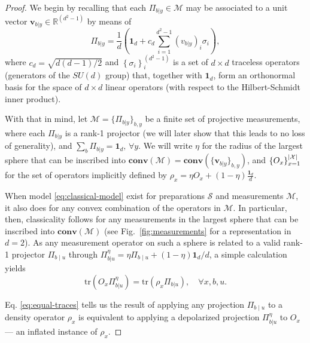 \documentclass[a4paper,preprintnumbers,floatfix,superscriptaddress,pra,twocolumn,showpacs,notitlepage,longbibliography]{revtex4-2}
\begin{document}
    \begin{proof}
        We begin by recalling that each $\Pi_{b \vert y} \in \mathcal{M}$ may be associated to a unit vector $\bm{v}_{b|y} \in \mathds{R}^{(d^{2}-1)}$ by means of
        \begin{equation}
            \Pi_{b|y} = \frac{1}{d}\left(\bm{1}_{d} + c_{d}\sum_{i=1}^{d^{2}-1}(v_{b|y})_{i} \sigma_{i}\right),
        \end{equation}
        where $c_{d} = \sqrt{d(d-1)/2}$ and $\left\{ \sigma_{i} \right\}_{i}^{(d^{2}-1)}$ is a set of $d \times d$ traceless operators (generators of the $SU(d)$ group) that, together with $\bm{1}_{d}$, form an orthonormal basis for the space of $d\times d$ linear operators (with respect to the Hilbert-Schmidt inner product).
        
        With that in mind, let $\mathcal{M} = \{ \Pi_{b \vert y} \}_{b, y}$ be a finite set of projective measurements, where each $\Pi_{b \vert y}$ is a rank-1 projector (we will later show that this leads to no loss of generality), and $\sum_b \Pi_{b \vert y} = \bm{1}_d, \,\forall y$. We will write $\eta$ for the radius of the largest sphere that can be inscribed into $\textbf{conv}(\mathcal{M}) = \textbf{conv}(\{ \bm{v}_{b|y} \}_{b,y} )$, and $\{ O_x \}_{x=1}^{\abs{\mathcal{X}}}$ for the set of operators implicitly defined by $\rho_x = \eta O_x + (1 - \eta) \frac{\bm{1}_d}{d}$.
        
        When model \eqref{eq:classical-model} exist for preparations $\mathcal{S}$ and measurements $\mathcal{M}$, it also does for any convex combination of the operators in $\mathcal{M}$. In particular, then, classicality follows for any measurements in the largest sphere that can be inscribed into $\textbf{conv}(\mathcal{M})$ (see Fig.~\ref{fig:measurements} for a representation in $d=2$). As any measurement operator on such a sphere is related to a valid rank-1 projector $\Pi_{b \mid u}$ through $\Pi_{b \vert u}^\eta = \eta \Pi_{b \mid u} + (1 - \eta) \mathbf{1}_d/d$, a simple calculation yields
        \begin{equation}
            \text{tr} \left( O_x \Pi_{b \vert u}^\eta \right) = \text{tr}\left( \rho_x \Pi_{b \vert u} \right), \quad \forall x, b, u .
            \label{eq:equal-traces}
        \end{equation}
        
        Eq. \eqref{eq:equal-traces} tells us the result of applying any projection $\Pi_{b \mid u}$ to a density operator $\rho_x$ is equivalent to applying a depolarized projection $\Pi_{b \vert u}^\eta$ to $O_x$ --- an inflated instance of $\rho_x$.
        

\end{proof}
\end{document}

